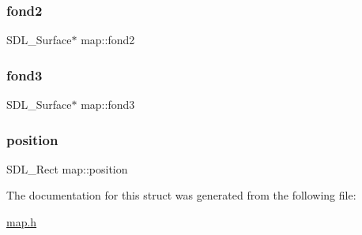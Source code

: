 \mbox{\label{structmap_a29e14b90ad5198d0052985f56a9f72de}} 
\subsubsection{\texorpdfstring{fond2}{fond2}}
{\footnotesize\ttfamily S\+D\+L\+\_\+\+Surface$\ast$ map\+::fond2}

\mbox{\label{structmap_a9ed7f9e559bd649cd29c8961bb647b5a}} 
\subsubsection{\texorpdfstring{fond3}{fond3}}
{\footnotesize\ttfamily S\+D\+L\+\_\+\+Surface$\ast$ map\+::fond3}

\mbox{\label{structmap_a22eebe2fbf7d3d3fea525b97643fb9fc}} 
\subsubsection{\texorpdfstring{position}{position}}
{\footnotesize\ttfamily S\+D\+L\+\_\+\+Rect map\+::position}



The documentation for this struct was generated from the following file\+:\begin{DoxyCompactItemize}
\item 
\hyperlink{map_8h}{map.\+h}\end{DoxyCompactItemize}
